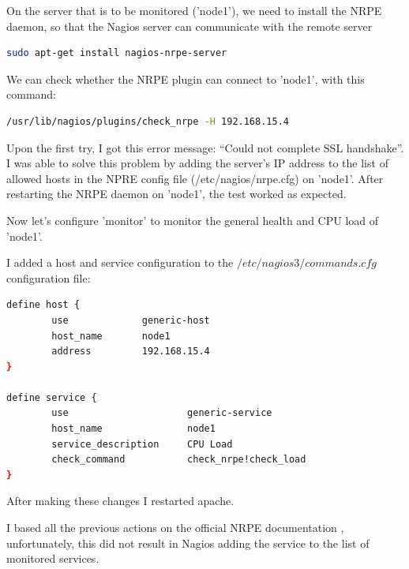 \documentclass[12pt]{report}
\begin{document}
On the server that is to be monitored ('node1'), we need to install the NRPE
daemon, so that the Nagios server can communicate with the remote
server
\begin{lstlisting}[language=bash]
  sudo apt-get install nagios-nrpe-server
\end{lstlisting} 

We can check whether the NRPE plugin can connect to 'node1', with this command:
\begin{lstlisting}[language=bash]
  /usr/lib/nagios/plugins/check_nrpe -H 192.168.15.4
\end{lstlisting} 
Upon the first try, I got this error message: ``Could not complete SSL
handshake''.
I was able to solve this problem by adding the server's IP address to
the list of allowed hosts in the NPRE config file
(/etc/nagios/nrpe.cfg) on 'node1'.
After restarting the NRPE daemon on 'node1', the test worked as
expected.

Now let's configure 'monitor' to monitor the general health and CPU load of  'node1'.

I added a host and service configuration to the
$/etc/nagios3/commands.cfg$ configuration file:
\begin{lstlisting}[language=bash]
define host {
        use             generic-host
        host_name       node1
        address         192.168.15.4
}

define service {
        use                     generic-service
        host_name               node1
        service_description     CPU Load
        check_command           check_nrpe!check_load
}
\end{lstlisting}
After making these changes I restarted apache.

I based all the previous actions on the official NRPE documentation
\cite{nrpe_doc}, unfortunately, this did not result in Nagios adding
the service to the list of monitored services.
\end{document}
